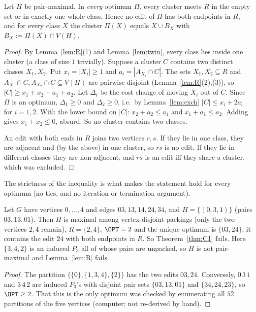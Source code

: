 \begin{theorem}\label{thm:C1}
Let $H$ be pair-maximal. In \emph{every} optimum $\Pi$, every cluster meets $R$ in the empty set or in exactly one whole class. Hence no edit of $\Pi$ has both endpoints in $R$, and for every class $X$ the cluster $\Pi(X)$ equals $X\cup B_X$ with $B_X:=\Pi(X)\cap V(H)$.
\end{theorem}
\begin{proof}
By Lemma~\ref{lem:R}(1) and Lemma~\ref{lem:twin}, every class lies inside one cluster (a class of size $1$ trivially). Suppose a cluster $C$ contains two distinct classes $X_1,X_2$. Put $x_i=|X_i|\ge1$ and $a_i=|A_{X_i}\cap C|$. The sets $X_1,X_2\subseteq R$ and $A_{X_1}\cap C,A_{X_2}\cap C\subseteq V(H)$ are pairwise disjoint (Lemma~\ref{lem:R}(2),(3)), so $|C|\ge x_1+x_2+a_1+a_2$. Let $\Delta_i$ be the cost change of moving $X_i$ out of $C$. Since $\Pi$ is an optimum, $\Delta_1\ge0$ and $\Delta_2\ge0$, i.e.\ by Lemma~\ref{lem:exch} $|C|\le x_i+2a_i$ for $i=1,2$. With the lower bound on $|C|$: $x_2+a_2\le a_1$ and $x_1+a_1\le a_2$. Adding gives $x_1+x_2\le0$, absurd. So no cluster contains two classes.

An edit with both ends in $R$ joins two vertices $r,s$. If they lie in one class, they are adjacent and (by the above) in one cluster, so $rs$ is no edit. If they lie in different classes they are non-adjacent, and $rs$ is an edit iff they share a cluster, which was excluded.
\end{proof}
The strictness of the inequality is what makes the statement hold for every optimum (no ties, and no iteration or termination argument).

\begin{proposition}\label{prop:vertexmax}
Let $G$ have vertices $0,\dots,4$ and edges $03,13,14,24,34$, and $H=\{(0,3,1)\}$ (pairs $03,13,01$). Then $H$ is maximal among vertex-disjoint packings (only the two vertices $2,4$ remain), $R=\{2,4\}$, $\OPT=2$ and the unique optimum is $\{03,24\}$; it contains the edit $24$ with both endpoints in $R$. So Theorem~\ref{thm:C1} fails. Here $\{3,4,2\}$ is an induced $P_3$ all of whose pairs are unpacked, so $H$ is not pair-maximal and Lemma~\ref{lem:R} fails.
\end{proposition}
\begin{proof}
The partition $\{\{0\},\{1,3,4\},\{2\}\}$ has the two edits $03,24$. Conversely, $0\,3\,1$ and $3\,4\,2$ are induced $P_3$'s with disjoint pair sets $\{03,13,01\}$ and $\{34,24,23\}$, so $\OPT\ge2$. That this is the only optimum was checked by enumerating all $52$ partitions of the five vertices (computer; not re-derived by hand).
\end{proof}

